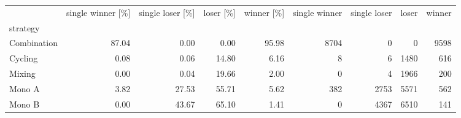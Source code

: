 \begin{tabular}{lrrrrrrrr}
\toprule
 & single winner [\%] & single loser [\%] & loser [\%] & winner [\%] & single winner & single loser & loser & winner \\
strategy &  &  &  &  &  &  &  &  \\
\midrule
Combination & 87.04 & 0.00 & 0.00 & 95.98 & 8704 & 0 & 0 & 9598 \\
Cycling & 0.08 & 0.06 & 14.80 & 6.16 & 8 & 6 & 1480 & 616 \\
Mixing & 0.00 & 0.04 & 19.66 & 2.00 & 0 & 4 & 1966 & 200 \\
Mono A & 3.82 & 27.53 & 55.71 & 5.62 & 382 & 2753 & 5571 & 562 \\
Mono B & 0.00 & 43.67 & 65.10 & 1.41 & 0 & 4367 & 6510 & 141 \\
\bottomrule
\end{tabular}
